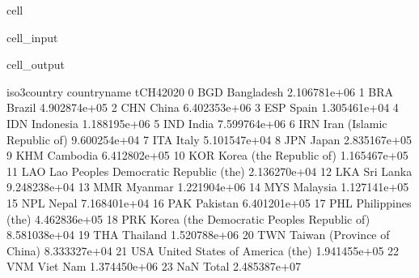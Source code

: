 \documentclass[letterpaper,10pt,english]{jupyterBook}
\begin{document}
\begin{sphinxuseclass}{cell}\begin{sphinxVerbatimInput}

\begin{sphinxuseclass}{cell_input}
\begin{sphinxVerbatim}[commandchars=\\\{\}]
\end{sphinxVerbatim}

\end{sphinxuseclass}\end{sphinxVerbatimInput}
\begin{sphinxVerbatimOutput}

\begin{sphinxuseclass}{cell_output}
\begin{sphinxVerbatim}[commandchars=\\\{\}]
   iso3\PYGZus{}country                                 country\PYGZus{}name     tCH4\PYGZus{}2020
0           BGD                                   Bangladesh  2.106781e+06
1           BRA                                       Brazil  4.902874e+05
2           CHN                                        China  6.402353e+06
3           ESP                                        Spain  1.305461e+04
4           IDN                                    Indonesia  1.188195e+06
5           IND                                        India  7.599764e+06
6           IRN                   Iran (Islamic Republic of)  9.600254e+04
7           ITA                                        Italy  5.101547e+04
8           JPN                                        Japan  2.835167e+05
9           KHM                                     Cambodia  6.412802e+05
10          KOR                      Korea (the Republic of)  1.165467e+05
11          LAO       Lao People\PYGZsq{}s Democratic Republic (the)  2.136270e+04
12          LKA                                    Sri Lanka  9.248238e+04
13          MMR                                      Myanmar  1.221904e+06
14          MYS                                     Malaysia  1.127141e+05
15          NPL                                        Nepal  7.168401e+04
16          PAK                                     Pakistan  6.401201e+05
17          PHL                            Philippines (the)  4.462836e+05
18          PRK  Korea (the Democratic People\PYGZsq{}s Republic of)  8.581038e+04
19          THA                                     Thailand  1.520788e+06
20          TWN                   Taiwan (Province of China)  8.333327e+04
21          USA               United States of America (the)  1.941455e+05
22          VNM                                     Viet Nam  1.374450e+06
23          NaN                                        Total  2.485387e+07
\end{sphinxVerbatim}

\end{sphinxuseclass}\end{sphinxVerbatimOutput}

\end{sphinxuseclass}
\end{document}
